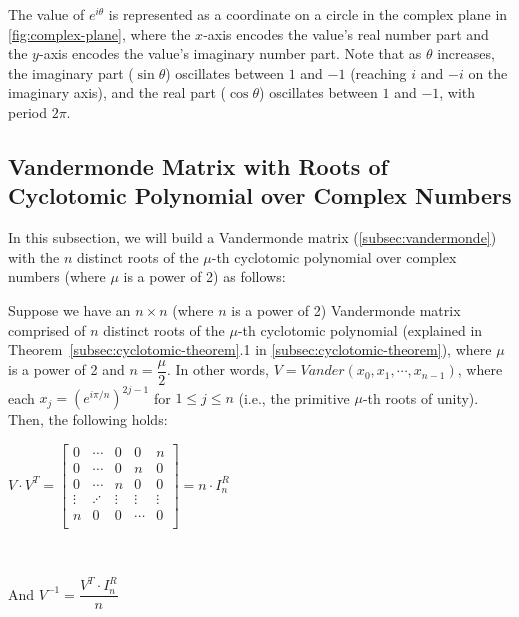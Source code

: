 The value of $e^{i\theta}$ is represented as a coordinate on a circle in the complex plane in \autoref{fig:complex-plane}, where the $x$-axis encodes the value's real number part and the $y$-axis encodes the value's imaginary number part. Note that as $\theta$ increases, the imaginary part ($\sin\theta$) oscillates between $1$ and $-1$ (reaching $i$ and $-i$ on the imaginary axis), and the real part ($\cos\theta$) oscillates between $1$ and $-1$, with period $2\pi$.


\subsection{Vandermonde Matrix with Roots of Cyclotomic Polynomial over Complex Numbers}
\label{subsec:vandermonde-euler}

 
 
In this subsection, we will build a Vandermonde matrix (\autoref{subsec:vandermonde}) with the $n$ distinct roots of the $\mu$-th cyclotomic polynomial over complex numbers (where $\mu$ is a power of 2) as follows:



\begin{tcolorbox}[title={\textbf{\tboxtheorem{\ref*{subsec:vandermonde-euler}} Vandermonde Matrix with the Roots of  \text{(power-of-2)}-th Cyclotomic Polynomial over Complex Numbers}}]

Suppose we have an $n \times n$ (where $n$ is a power of 2) Vandermonde matrix comprised of $n$ distinct roots of the $\mu$-th cyclotomic polynomial (explained in Theorem~\ref*{subsec:cyclotomic-theorem}.1 in \autoref{subsec:cyclotomic-theorem}), where $\mu$ is a power of 2 and $n = \dfrac{\mu}{2}$. In other words, $V = \mathit{Vander}(x_0, x_1, \cdots, x_{n-1})$, where each $x_j = (e^{i\pi/n})^{2j-1}$ for $1 \leq j \leq n$ (i.e., the primitive $\mu$-th roots of unity). Then, the following holds:

$V \cdot V^T = \begin{bmatrix}
0 & \cdots & 0 & 0 & n\\
0 & \cdots & 0 & n & 0\\
0 & \cdots & n & 0 & 0\\
\vdots & \iddots & \vdots & \vdots & \vdots \\
n & 0 & 0 & \cdots & 0\\
\end{bmatrix} = n \cdot I^R_n$

$ $

And $V^{-1} = \dfrac{V^T \cdot I_n^R}{n}$


\end{tcolorbox}


